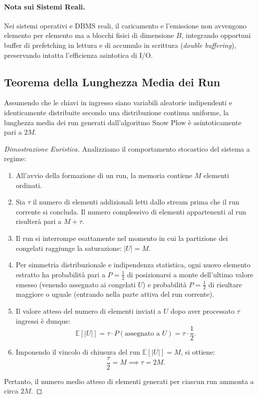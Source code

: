\paragraph{Nota sui Sistemi Reali.}
Nei sistemi operativi e DBMS reali, il caricamento e l'emissione non avvengono elemento per elemento ma a blocchi fisici di dimensione $B$, integrando opportuni buffer di prefetching in lettura e di accumulo in scrittura (\textit{double buffering}), preservando intatta l'efficienza asintotica di I/O.

\FloatBarrier
\subsection{Teorema della Lunghezza Media dei Run}
\label{subsec:snow-plow-theorem}

\begin{theorem}
\label{thm:snow-plow-length}
Assumendo che le chiavi in ingresso siano variabili aleatorie indipendenti e identicamente distribuite secondo una distribuzione continua uniforme, la lunghezza media dei run generati dall'algoritmo Snow Plow \`e asintoticamente pari a $2M$.
\end{theorem}

\begin{proof}[Dimostrazione Euristica]
Analizziamo il comportamento stocastico del sistema a regime:
\begin{enumerate}
  \item All'avvio della formazione di un run, la memoria contiene $M$ elementi ordinati.
  \item Sia $\tau$ il numero di elementi addizionali letti dallo stream prima che il run corrente si concluda. Il numero complessivo di elementi appartenenti al run risulterà pari a $M + \tau$.
  \item Il run si interrompe esattamente nel momento in cui la partizione dei congelati raggiunge la saturazione: $\vert{}U\vert{} = M$.
  \item Per simmetria distribuzionale e indipendenza statistica, ogni nuovo elemento estratto ha probabilità pari a $P = \frac{1}{2}$ di posizionarsi a monte dell'ultimo valore emesso (venendo assegnato ai congelati $U$) e probabilità $P = \frac{1}{2}$ di risultare maggiore o uguale (entrando nella parte attiva del run corrente).
  \item Il valore atteso del numero di elementi inviati a $U$ dopo aver processato $\tau$ ingressi è dunque:
  \begin{equation}
    \mathbb{E}[\vert{}U\vert{}] = \tau \cdot P(\text{assegnato a } U) = \tau \cdot \frac{1}{2}.
  \end{equation}
  \item Imponendo il vincolo di chiusura del run $\mathbb{E}[\vert{}U\vert{}] = M$, si ottiene:
  \begin{equation}
    \frac{\tau}{2} = M \implies \tau = 2M.
  \end{equation}
\end{enumerate}
Pertanto, il numero medio atteso di elementi generati per ciascun run ammonta a circa $2M$.
\end{proof}

